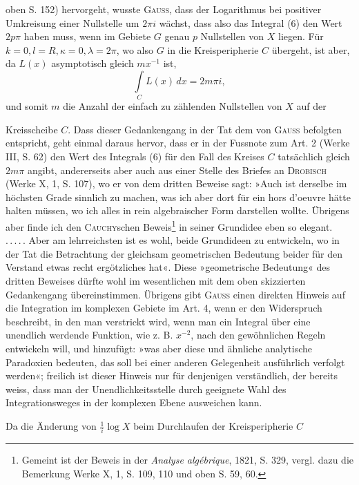 oben S. 152) hervorgeht, wusste \textsc{Gauss}, dass der Logarithmus bei positiver Umkreisung
einer Nullstelle um \(2\pi i\) wächst, dass also das Integral (6) den Wert
\(2p\pi\) haben muss, wenn im Gebiete \(G\) genau \(p\) Nullstellen von \(X\) liegen.
Für \(k=0,l=R,\kappa=0,\lambda=2\pi\), wo also \(G\) in die Kreisperipherie \(C\) übergeht,
ist aber, da \(L(x)\) asymptotisch gleich \(mx^{-1}\) ist,
\[
\int\limits_C L(x)\,dx=2m\pi i,
\]
und somit \(m\) die Anzahl der einfach zu zählenden Nullstellen von \(X\) auf der\par
\clearpage{}
\noindent Kreisscheibe \(C\). Dass dieser Gedankengang in der Tat dem von \textsc{Gauss} befolgten
entspricht, geht einmal daraus hervor, dass er in der Fussnote zum
Art. 2 (Werke III, S. 62) den Wert des Integrals (6) für den Fall des Kreises
\(C\) tatsächlich gleich \(2m\pi\) angibt, andererseits aber auch aus einer Stelle des
Briefes an \textsc{Drobisch} (Werke X, 1, S. 107), wo er von dem dritten Beweise
sagt: »Auch ist derselbe im höchsten Grade sinnlich zu machen, was ich aber
dort für ein hors d'oeuvre hätte halten müssen, wo ich alles in rein algebraischer
Form darstellen wollte. Übrigens aber finde ich den \textsc{Cauchy}schen
Beweis\footnote{Gemeint ist der Beweis in der \textit{Analyse algébrique}, 1821, S. 329, vergl. dazu die Bemerkung Werke X, 1, S. 109, 110 und oben S. 59, 60.} in seiner Grundidee eben so elegant. \mbox{.\,.\,.\,.\,.} Aber am lehrreichsten
ist es wohl, beide Grundideen zu entwickeln, wo in der Tat die Betrachtung
der gleichsam geometrischen Bedeutung beider für den Verstand etwas recht
ergötzliches hat«. Diese »geometrische Bedeutung« des dritten Beweises dürfte
wohl im wesentlichen mit dem oben skizzierten Gedankengang übereinstimmen.
Übrigens gibt \textsc{Gauss} einen direkten Hinweis auf die Integration im komplexen
Gebiete im Art. 4, wenn er den Widerspruch beschreibt, in den man verstrickt
wird, wenn man ein Integral über eine unendlich werdende Funktion,
wie z. B. \(x^{-2}\), nach den gewöhnlichen Regeln entwickeln will, und hinzufügt:
»was aber diese und ähnliche analytische Paradoxien bedeuten, das soll bei
einer anderen Gelegenheit ausführlich verfolgt werden«; freilich ist dieser Hinweis
nur für denjenigen verständlich, der bereits weiss, dass man der Unendlichkeitsstelle
durch geeignete Wahl des Integrationsweges in der komplexen
Ebene ausweichen kann.
\par
Da die Änderung von \(\frac1i\log X\) beim Durchlaufen der Kreisperipherie \(C\)
